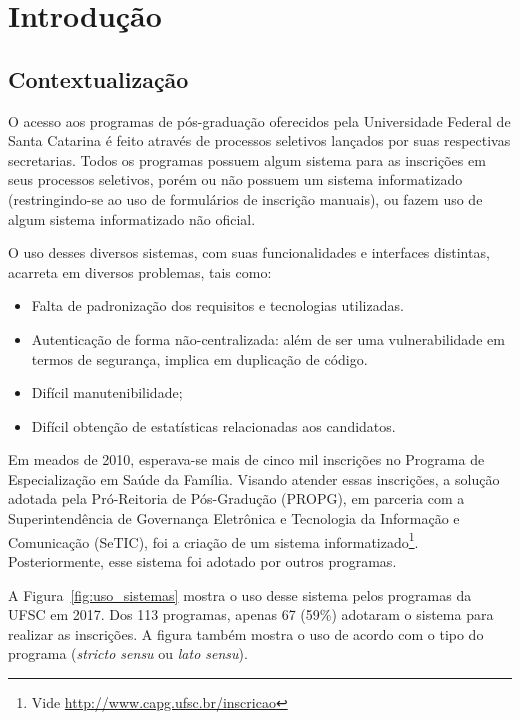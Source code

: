 \documentclass[
  10.5pt,				  %
	openright,			%
	twoside,			  %
  a5paper,
  chapter=TITLE,	%
	section=TITLE,	%
  hyphens,        %
	english,        %
	brazil          %
]{abntex2}
\begin{document}
\setcounter{page}{5}

\chapter{Introdução}

\section{Contextualização}

O acesso aos programas de pós-graduação oferecidos pela Universidade Federal de Santa Catarina é feito através de processos seletivos lançados por suas respectivas secretarias. Todos os programas possuem algum sistema para as inscrições em seus processos seletivos, porém ou não possuem um sistema informatizado (restringindo-se ao uso de formulários de inscrição manuais), ou fazem uso de algum sistema informatizado não oficial. 

O uso desses diversos sistemas, com suas funcionalidades e interfaces distintas, acarreta em diversos problemas, tais como:
\begin{itemize}
  \item Falta de padronização dos requisitos e tecnologias utilizadas.
  \item Autenticação de forma não-centralizada: além de ser uma vulnerabilidade em termos de segurança, implica em duplicação de código.
  \item Difícil manutenibilidade;
  \item Difícil obtenção de estatísticas relacionadas aos candidatos.
\end{itemize}

Em meados de 2010, esperava-se mais de cinco mil inscrições no Programa de Especialização em Saúde da Família. Visando atender essas inscrições, a solução adotada pela Pró-Reitoria de Pós-Gradução (PROPG), em parceria com a Superintendência de Governança Eletrônica e Tecnologia da Informação e Comunicação (SeTIC), foi a criação de um sistema informatizado\footnote{Vide \href{}{http://www.capg.ufsc.br/inscricao}}. Posteriormente, esse sistema foi adotado por outros programas.

A Figura~\ref{fig:uso_sistemas} mostra o uso desse sistema pelos programas da UFSC em 2017. Dos 113 programas, apenas 67 (59\%) adotaram o sistema para realizar as inscrições. A figura também mostra o uso de acordo com o tipo do programa (\emph{stricto sensu} ou \emph{lato sensu}).
\end{document}

